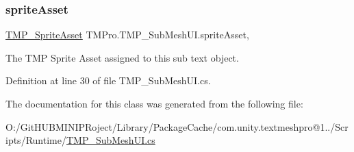 \subsubsection{\texorpdfstring{spriteAsset}{spriteAsset}}
{\footnotesize\ttfamily \mbox{\hyperlink{class_t_m_pro_1_1_t_m_p___sprite_asset}{T\+M\+P\+\_\+\+Sprite\+Asset}} T\+M\+Pro.\+T\+M\+P\+\_\+\+Sub\+Mesh\+U\+I.\+sprite\+Asset\hspace{0.3cm}{\ttfamily [get]}, {\ttfamily [set]}}



The T\+MP Sprite Asset assigned to this sub text object. 



Definition at line 30 of file T\+M\+P\+\_\+\+Sub\+Mesh\+U\+I.\+cs.



The documentation for this class was generated from the following file\+:\begin{DoxyCompactItemize}
\item 
O\+:/\+Git\+H\+U\+B\+M\+I\+N\+I\+P\+Roject/\+Library/\+Package\+Cache/com.\+unity.\+textmeshpro@1../\+Scripts/\+Runtime/\mbox{\hyperlink{_t_m_p___sub_mesh_u_i_8cs}{T\+M\+P\+\_\+\+Sub\+Mesh\+U\+I.\+cs}}\end{DoxyCompactItemize}
